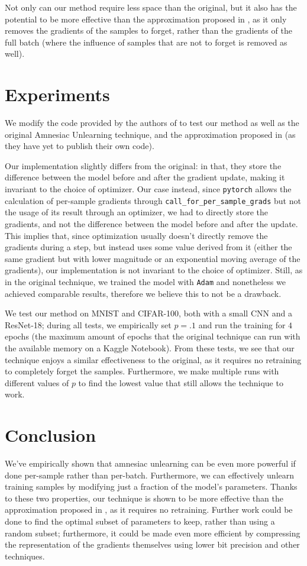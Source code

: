 \documentclass{article}
\begin{document}
Not only can our method require less space than the original, but it also has the potential to be more effective than the approximation proposed in \cite{gogineni2024efficient}, as it only removes the gradients of the samples to forget, rather than the gradients of the full batch (where the influence of samples that are not to forget is removed as well).

\section{Experiments} We modify the code provided by the authors of \cite{graves2021amnesiac} to test our method as well as the original Amnesiac Unlearning technique, and the approximation proposed in \cite{gogineni2024efficient} (as they have yet to publish their own code).

Our implementation slightly differs from the original: in that, they store the difference between the model before and after the gradient update, making it invariant to the choice of optimizer. Our case instead, since \texttt{pytorch} allows the calculation of per-sample gradients through \texttt{call\_for\_per\_sample\_grads} but not the usage of its result through an optimizer, we had to directly store the gradients, and not the difference between the model before and after the update. This implies that, since optimization usually doesn't directly remove the gradients during a step, but instead uses some value derived from it (either the same gradient but with lower magnitude or an exponential moving average of the gradients), our implementation is not invariant to the choice of optimizer. Still, as in the original technique, we trained the model with \texttt{Adam} and nonetheless we achieved comparable results, therefore we believe this to not be a drawback.

We test our method on MNIST and CIFAR-100, both with a small CNN and a ResNet-18; during all tests, we empirically set $p=.1$ and run the training for $4$ epochs (the maximum amount of epochs that the original technique can run with the available memory on a Kaggle Notebook). From these tests, we see that our technique enjoys a similar effectiveness to the original, as it requires no retraining to completely forget the samples. Furthermore, we make multiple runs with different values of $p$ to find the lowest value that still allows the technique to work.

\section{Conclusion}
We've empirically shown that amnesiac unlearning can be even more powerful if done per-sample rather than per-batch. Furthermore, we can effectively unlearn training samples by modifying just a fraction of the model's parameters. Thanks to these two properties, our technique is shown to be more effective than the approximation proposed in \cite{gogineni2024efficient}, as it requires no retraining. Further work could be done to find the optimal subset of parameters to keep, rather than using a random subset; furthermore, it could be made even more efficient by compressing the representation of the gradients themselves using lower bit precision and other techniques.



\end{document}
